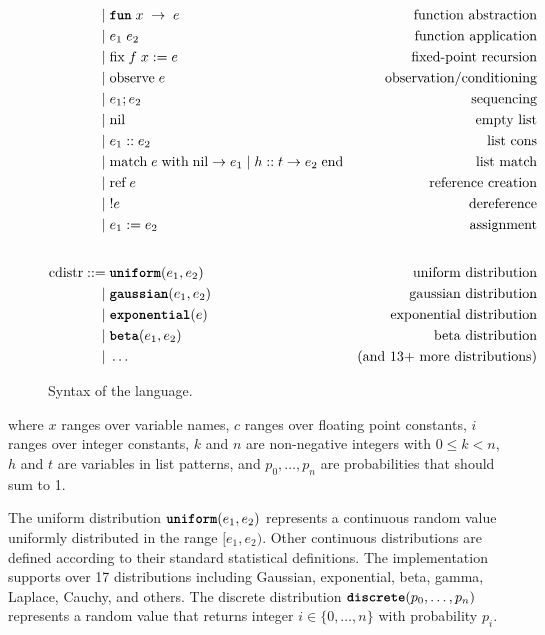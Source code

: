 \begin{figure}[h]
\begin{align*}
    | &\; \funkw \; x \; \rightarrow \; e & \text{function abstraction} \\
    | &\; e_1 \; e_2                      & \text{function application} \\
    | &\; \text{fix}\; f\; x := e         & \text{fixed-point recursion} \\
    | &\; \text{observe}\; e              & \text{observation/conditioning} \\
    | &\; e_1; e_2                        & \text{sequencing} \\
    | &\; \text{nil}                      & \text{empty list} \\
    | &\; e_1 :: e_2                      & \text{list cons} \\
    | &\; \text{match}\; e\; \text{with}\; \text{nil} \rightarrow e_1 \mid h :: t \rightarrow e_2\; \text{end} & \text{list match} \\
    | &\; \text{ref}\; e                  & \text{reference creation} \\
    | &\; !e                              & \text{dereference} \\
    | &\; e_1 := e_2                      & \text{assignment} \\
    \\[1ex] %
\text{cdistr} ::= &\; \uniform(e_1, e_2)      & \text{uniform distribution} \\
           | &\; \gaussian(e_1, e_2)   & \text{gaussian distribution} \\
           | &\; \exponential(e)       & \text{exponential distribution} \\
           | &\; \betafn(e_1, e_2)     & \text{beta distribution} \\
           | &\; \ldots                & \text{(and 13+ more distributions)}
\end{align*}
\caption{Syntax of the \Slice{} language.}
\label{fig:grammar}
\end{figure}

\noindent where $x$ ranges over variable names, $c$ ranges over floating point constants, $i$ ranges over integer constants, $k$ and $n$ are non-negative integers with $0 \leq k < n$, $h$ and $t$ are variables in list patterns, and $p_0, \ldots, p_n$ are probabilities that should sum to 1.

The uniform distribution $\text{\ttfamily\bfseries uniform}(e_1, e_2)$ represents a continuous random value uniformly distributed in the range $[e_1, e_2)$. Other continuous distributions are defined according to their standard statistical definitions. The implementation supports over 17 distributions including Gaussian, exponential, beta, gamma, Laplace, Cauchy, and others. The discrete distribution $\text{\ttfamily\bfseries discrete}(p_0, \ldots, p_{n})$ represents a random value that returns integer $i \in \{0, \ldots, n\}$ with probability $p_i$.

